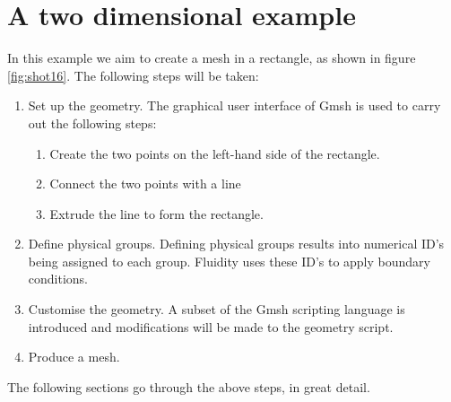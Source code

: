 \section{A two dimensional example}
\label{sect:two_dimensional_example}
\par
In this example we aim to create a mesh in a rectangle, as shown in figure
\ref{fig:shot16}.
The following steps will be taken:
\begin{enumerate}
  \item Set up the geometry. The graphical user interface of Gmsh is used to carry out the following
           steps:
  \begin{enumerate}
    \item Create the two points on the left-hand side of the rectangle.
    \item Connect the two points with a line
    \item Extrude the line to form the rectangle.
  \end{enumerate}
  \item Define physical groups. Defining physical groups results into numerical ID's being assigned to
           each group. Fluidity uses these ID's to apply boundary conditions.
  \item Customise the geometry. A subset of the Gmsh scripting language is introduced and modifications
           will be made to the geometry script.
  \item Produce a mesh.
\end{enumerate}
The following sections go through the above steps, in great detail.

